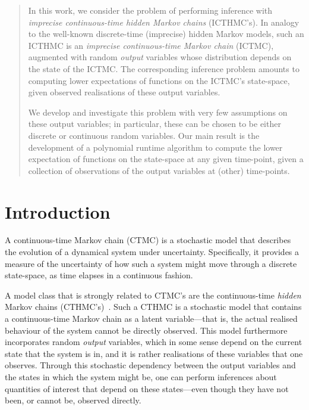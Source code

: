 \documentclass[twoside,11pt]{article}
\begin{document}
\begin{abstract}
In this work, we consider the problem of performing inference with \emph{imprecise continuous-time hidden Markov chains} (ICTHMC's). In analogy to the well-known discrete-time (imprecise) hidden Markov models, such an ICTHMC is an \emph{imprecise continuous-time Markov chain} (ICTMC), augmented with random \emph{output} variables whose distribution depends on the state of the ICTMC. The corresponding inference problem amounts to computing lower expectations of functions on the ICTMC's state-space, given observed realisations of these output variables.

We develop and investigate this problem with very few assumptions on these output variables; in particular, these can be chosen to be either discrete or continuous random variables. Our main result is the development of a polynomial runtime algorithm to compute the lower expectation of functions on the state-space at any given time-point, given a collection of observations of the output variables at (other) time-points.
\end{abstract}

\section{Introduction}\label{sec:introduction}

A continuous-time Markov chain (CTMC) is a stochastic model that describes the evolution of a dynamical system under uncertainty. Specifically, it provides a measure of the uncertainty of how such a system might move through a discrete state-space, as time elapses in a continuous fashion.

A model class that is strongly related to CTMC's are the continuous-time \emph{hidden} Markov chains (CTHMC's)~\cite{wei2002continuous}. Such a CTHMC is a stochastic model that contains a continuous-time Markov chain as a latent variable---that is, the actual realised behaviour of the system cannot be directly observed. This model furthermore incorporates random \emph{output} variables, which in some sense depend on the current state that the system is in, and it is rather realisations of these variables that one observes. Through this stochastic dependency between the output variables and the states in which the system might be, one can perform inferences about quantities of interest that depend on these states---even though they have not been, or cannot be, observed directly.

\end{document}
